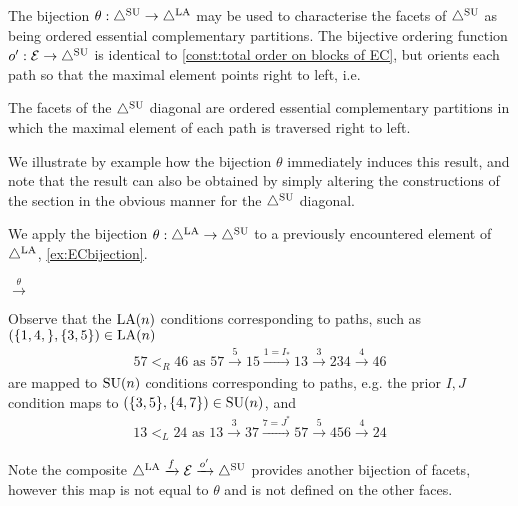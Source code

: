 The bijection $\theta:\triangle^{\mathrm{SU}} \to \triangle^{\mathrm{LA}}$ may be used to characterise the facets of $\triangle^{\mathrm{SU}}$ as being ordered essential complementary partitions. The bijective ordering function $o':\mathcal{E}\to \triangle^{\mathrm{SU}}$ is identical to \cref{const:total order on blocks of EC}, but orients each path so that the maximal element points right to left, i.e. 
\begin{proposition}\label{prop:SUD are ordered EC}
The facets of the $\triangle^{\mathrm{SU}}$ diagonal are ordered essential complementary partitions in which the maximal element of each path is traversed right to left.
\end{proposition}
We illustrate by example how the bijection $\theta$ immediately induces this result, and note that the result can also be obtained by simply altering the constructions of the section in the obvious manner for the $\triangle^{\mathrm{SU}}$ diagonal.
\begin{example}\label{ex:theta and path translation}
We apply the bijection $\theta:\triangle^{\mathrm{LA}}\to \triangle^{\mathrm{SU}}$ to a previously encountered element of $\triangle^{\mathrm{LA}}$, \cref{ex:ECbijection}.
\begin{center}
$
\xrightarrow{\theta}
$
\end{center}
Observe that the $\mathrm{LA}(n)$ conditions corresponding to paths, such as $( \{1,4,\},\{3,5\}) \in \mathrm{LA}(n)$
\begin{align*}
    57 <_R 46 \text{ as } 57 \xrightarrow{5} 15 \xrightarrow{1=I_*} 13 \xrightarrow{3} 234 \xrightarrow{4} 46
\end{align*}
are mapped to $\mathrm{SU}(n)$ conditions corresponding to paths, e.g. the prior $I,J$ condition maps to $( \{3,5 \},\{4,7\}) \in \mathrm{SU}(n)$, and
\begin{align*}
    13 <_L 24 \text{ as } 13 \xrightarrow{3} 37 \xrightarrow{7=J^*} 57 \xrightarrow{5} 456 \xrightarrow{4} 24
\end{align*}

\end{example}
Note the composite $\triangle^{\mathrm{LA}} \xrightarrow{f} \mathcal{E} \xrightarrow{o'} \triangle^{\mathrm{SU}}$ provides another bijection of facets, however this map is not equal to $\theta$ and is not defined on the other faces.

